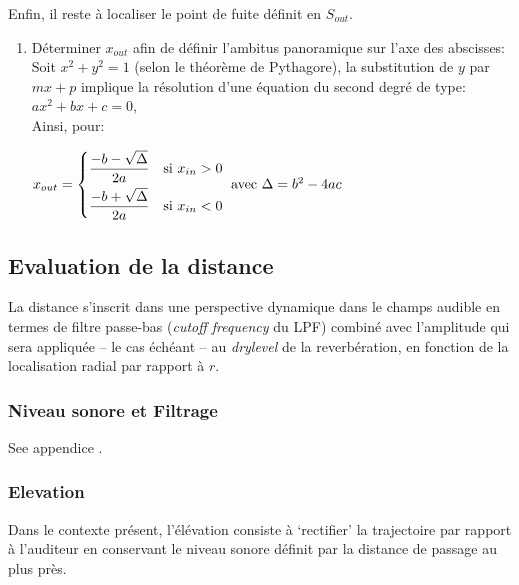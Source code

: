  \bigskip
 
\noindent Enfin, il reste \`a localiser le point de fuite d\'efinit en $S_{out}$. 

 \begin{enumerate}[resume]
\item D\'eterminer $x_{out}$ afin de d\'efinir l'ambitus panoramique sur l'axe des abscisses:\\ 
Soit $x^2+y^2=1$ (selon le th\'eor\`eme de Pythagore),
la substitution de $y$ par $mx+p$ implique la r\'esolution d'une \'equation du second degr\'e de type: $ax^2+bx+c=0$,\\
Ainsi, pour:\\
$
   x_{out}=
\begin{dcases}
    \frac{-b-\sqrt{\Delta}}{2a}& \text{si } x_{in}>0\\
    \frac{-b+\sqrt{\Delta}}{2a}& \text{si } x_{in}<0
\end{dcases}
\text{ avec } \Delta=b^2-4ac
$
\end{enumerate}

\subsection*{Evaluation de la distance}

La distance s'inscrit dans une perspective dynamique dans le champs audible en termes de filtre passe-bas (\textit{cutoff frequency} du LPF) combin\'e avec l'amplitude qui sera appliqu\'ee -- le cas \'ech\'eant -- au \textit{drylevel} de la reverb\'eration, en fonction de la localisation radial par rapport \`a $r$.%

\subsubsection*{Niveau sonore et Filtrage}

See appendice .

\subsubsection*{Elevation}

Dans le contexte pr\'esent, l'\'el\'evation consiste \`a `rectifier' la trajectoire par rapport \`a l'auditeur en conservant le niveau sonore d\'efinit par la distance de passage au plus pr\`es.%

